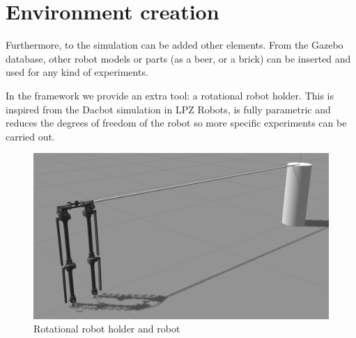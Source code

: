 \section{Environment creation} %
\label{sec:environment_creation}
Furthermore, to the simulation can be added other elements.
From the Gazebo database, other robot models or parts (as a beer, or a brick) can be inserted and used for any kind of experiments.

In the framework we provide an extra tool: a rotational robot holder.
This is inspired from the Dacbot simulation in LPZ Robots, is fully parametric and reduces the degrees of freedom of the robot so more specific experiments can be carried out.

\begin{figure}[hb!]
  \centering
  \includegraphics[width=0.75\linewidth]{figures/gazebo_rotational_holder}
  \caption{Rotational robot holder and robot}
  \label{fig:rotational_robot_holder}
\end{figure}
